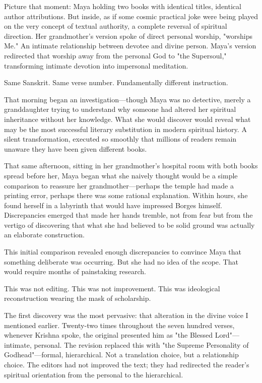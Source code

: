 \documentclass[12pt,twoside]{book}
\begin{document}
Picture that moment: Maya holding two books with identical titles, identical author attributions. But inside, as if some cosmic practical joke were being played on the very concept of textual authority, a complete reversal of spiritual direction. Her grandmother's version spoke of direct personal worship, "worships Me." An intimate relationship between devotee and divine person. Maya's version redirected that worship away from the personal God to "the Supersoul," transforming intimate devotion into impersonal meditation.

Same Sanskrit. Same verse number. Fundamentally different instruction.

That morning began an investigation—though Maya was no detective, merely a granddaughter trying to understand why someone had altered her spiritual inheritance without her knowledge. What she would discover would reveal what may be the most successful literary substitution in modern spiritual history. A silent transformation, executed so smoothly that millions of readers remain unaware they have been given different books.

That same afternoon, sitting in her grandmother's hospital room with both books spread before her, Maya began what she naively thought would be a simple comparison to reassure her grandmother—perhaps the temple had made a printing error, perhaps there was some rational explanation. Within hours, she found herself in a labyrinth that would have impressed Borges himself. Discrepancies emerged that made her hands tremble, not from fear but from the vertigo of discovering that what she had believed to be solid ground was actually an elaborate construction.

This initial comparison revealed enough discrepancies to convince Maya that something deliberate was occurring. But she had no idea of the scope. That would require months of painstaking research.

This was not editing. This was not improvement. This was ideological reconstruction wearing the mask of scholarship.

The first discovery was the most pervasive: that alteration in the divine voice I mentioned earlier. Twenty-two times throughout the seven hundred verses, whenever Krishna spoke, the original presented him as "the Blessed Lord"—intimate, personal. The revision replaced this with "the Supreme Personality of Godhead"—formal, hierarchical. Not a translation choice, but a relationship choice. The editors had not improved the text; they had redirected the reader's spiritual orientation from the personal to the hierarchical.
\end{document}
